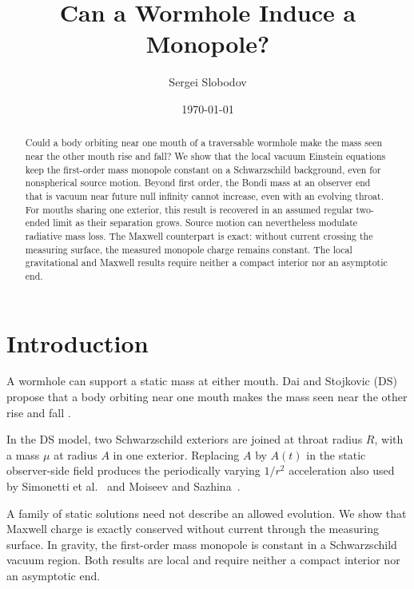 \documentclass[aps,prd,10pt,onecolumn,nofootinbib,superscriptaddress,floatfix]{revtex4-2}
\begin{document}
\raggedbottom

\title{Can a Wormhole Induce a Monopole?}

\author{Sergei Slobodov}
\noaffiliation

\date{\today}

\begin{abstract}
Could a body orbiting near one mouth of a traversable wormhole make the mass
seen near the other mouth rise and fall?  We show that the local vacuum
Einstein equations keep the first-order mass monopole constant on a
Schwarzschild background, even for nonspherical source motion.
Beyond first order, the Bondi mass at an observer end that is vacuum near future
null infinity cannot increase, even with an evolving throat.  For mouths
sharing one exterior, this result is recovered in an assumed regular
two-ended limit as their separation grows.
Source motion can nevertheless modulate radiative mass loss.
The Maxwell counterpart is exact: without current crossing the measuring
surface, the measured monopole charge remains constant.
The local gravitational and Maxwell results require neither a compact
interior nor an asymptotic end.
\end{abstract}

\maketitle

\section{Introduction}
\label{sec:introduction}

A wormhole can support a static mass at either mouth.  Dai and Stojkovic
(DS) propose that a body orbiting near one mouth makes the mass seen near
the other rise and fall \cite{DaiStojkovic2019Observing}.

In the DS model, two Schwarzschild exteriors are joined at throat radius
$R$, with a mass $\mu$ at radius $A$ in one exterior.  Replacing $A$ by
$A(t)$ in the static observer-side field produces the periodically
varying $1/r^2$ acceleration also used by
Simonetti et al.~\cite{SimonettiEtAl2021SensitiveSearches} and
Moiseev and Sazhina~\cite{MoiseevSazhina2025ObservationalSearch}.

A family of static solutions need not describe an allowed evolution.
We show that Maxwell charge is exactly conserved without current through
the measuring surface.  In gravity, the first-order mass monopole is
constant in a Schwarzschild vacuum region.  Both results are local and
require neither a compact interior
nor an asymptotic end.
\end{document}
